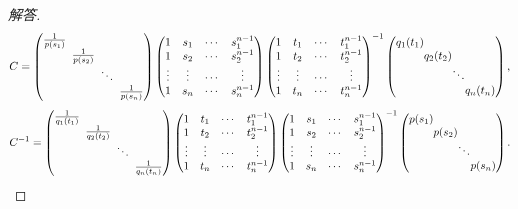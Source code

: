 \documentclass[a4paper,fontset=windows]{ctexbook}
\theoremstyle{definition}
\begin{document}
\begin{proof}[解答]
$$C=\begin{pmatrix}\frac{1}{p(s_1)}&&& \\ &\hspace{-5pt}\frac{1}{p(s_2)}&& \\ &&\hspace{-5pt}\ddots& \\ &&&\hspace{-5pt}\frac{1}{p(s_n)}\end{pmatrix}\begin{pmatrix}1&s_1&\cdots&s_1^{n-1} \\ 1&s_2&\cdots&s_2^{n-1} \\ \vdots&\vdots&\cdots&\vdots \\ 1&s_n&\cdots&s_n^{n-1}\end{pmatrix}\begin{pmatrix}1&t_1&\cdots&t_1^{n-1} \\ 1&t_2&\cdots&t_2^{n-1} \\ \vdots&\vdots&\cdots&\vdots \\ 1&t_n&\cdots&t_n^{n-1}\end{pmatrix}^{-1}\begin{pmatrix}q_1(t_1)&&& \\ &\hspace{-10pt}q_2(t_2)&& \\ &&\hspace{-10pt}\ddots& \\ &&&\hspace{-10pt}q_n(t_n)\end{pmatrix},$$
$$C^{-1}=\begin{pmatrix}\frac{1}{q_1(t_1)}&&& \\ &\hspace{-5pt}\frac{1}{q_2(t_2)}&& \\ &&\hspace{-5pt}\ddots& \\ &&&\hspace{-5pt}\frac{1}{q_n(t_n)}\end{pmatrix}\begin{pmatrix}1&t_1&\cdots&t_1^{n-1} \\ 1&t_2&\cdots&t_2^{n-1} \\ \vdots&\vdots&\cdots&\vdots \\ 1&t_n&\cdots&t_n^{n-1}\end{pmatrix}\begin{pmatrix}1&s_1&\cdots&s_1^{n-1} \\ 1&s_2&\cdots&s_2^{n-1} \\ \vdots&\vdots&\cdots&\vdots \\ 1&s_n&\cdots&s_n^{n-1}\end{pmatrix}^{-1}\begin{pmatrix}p(s_1)&&& \\ &\hspace{-10pt}p(s_2)&& \\ &&\hspace{-10pt}\ddots& \\ &&&\hspace{-10pt}p(s_n)\end{pmatrix}.$$

\end{proof}
\end{document}
